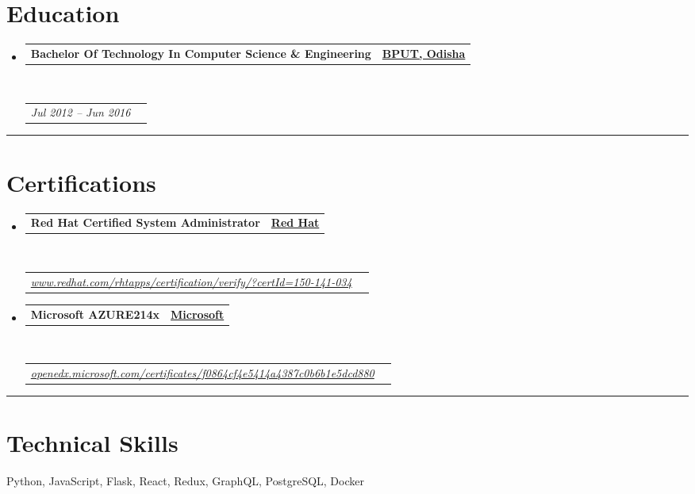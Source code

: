 \documentclass[10pt,a4paper,hidelinks]{article}
\makeatletter
\newenvironment{indentsection}[1]%
{\begin{list}{}%
	{\setlength{\leftmargin}{#1}}%
	\item[]%
}
{\end{list}}
\newcommand{\headerrow}[2]
{\begin{tabular*}{\linewidth}{l@{\extracolsep{\fill}}r}
	#1 &
	#2 \\
\end{tabular*}}
\makeatother
\begin{document}
\section*{Education}

\begin{itemize}
	\parskip=0.1em

	\item 
	\headerrow
		{\textbf{Bachelor Of Technology In Computer Science \& Engineering}}
		{{\href{http://www.bput.ac.in/}{\textbf{BPUT, Odisha}}}}
	\\
	\headerrow
		{\emph{Jul 2012 -- Jun 2016}}
		{\emph{}}

\end{itemize}


\hrule
\vspace{-0.3em}
\section*{Certifications}

\begin{itemize}
	\parskip=0.1em

	\item 
	\headerrow
		{\textbf{Red Hat Certified System Administrator}}
		{{\href{https://www.redhat.com/}{\textbf{Red Hat}}}}
	\\
	\headerrow
	    {\emph{\href{https://www.redhat.com/rhtapps/certification/verify/?certId=150-141-034}{www.redhat.com/rhtapps/certification/verify/?certId=150-141-034}}}
		{\emph{}}
	
	\item 
	\headerrow
		{\textbf{Microsoft AZURE214x}}
		{{\href{https://www.microsoft.com/}{\textbf{Microsoft}}}}
	\\
	\headerrow
	    {\emph{\href{https://openedx.microsoft.com/certificates/f0864cf4e5414a4387c0b6b1e5dcd880}{openedx.microsoft.com/certificates/f0864cf4e5414a4387c0b6b1e5dcd880}}}
		{\emph{}}

\end{itemize}


\hrule
\vspace{-0.3em}
\section*{Technical Skills}

\begin{indentsection}{\parindent}
\begin{description*}
    Python, JavaScript, Flask, React, Redux, GraphQL, PostgreSQL, Docker
\end{description*}
\end{indentsection}
\end{document}
